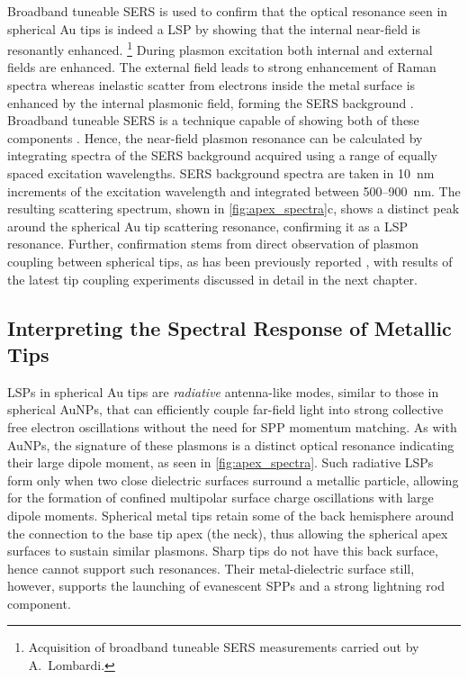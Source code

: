 \documentclass{article}
\begin{document}
Broadband tuneable SERS \cite{lombardi2015} is used to confirm that the optical resonance seen in spherical Au tips is indeed a LSP by showing that the internal near-field is resonantly enhanced.%
\footnote{Acquisition of broadband tuneable SERS measurements carried out by A.\ Lombardi.}
During plasmon excitation both internal and external fields are enhanced. The external field leads to strong enhancement of Raman spectra whereas inelastic scatter from electrons inside the metal surface is enhanced by the internal plasmonic field, forming the SERS background \cite{hugall2015}. Broadband tuneable SERS is a technique capable of showing both of these components \cite{lombardi2015}. Hence, the near-field plasmon resonance can be calculated by integrating spectra of the SERS background acquired using a range of equally spaced excitation wavelengths.
SERS background spectra are taken in \SI{10}{nm} increments of the excitation wavelength and integrated between 500--\SI{900}{nm}.
The resulting scattering spectrum, shown in \autoref{fig:apex_spectra}c, shows a distinct peak around the spherical Au tip scattering resonance, confirming it as a LSP resonance. Further, confirmation stems from direct observation of plasmon coupling between spherical tips, as has been previously reported \cite{savage2012}, with results of the latest tip coupling experiments discussed in detail in the next chapter.

\FloatBarrier
\subsection{Interpreting the Spectral Response of Metallic Tips}

LSPs in spherical Au tips are \emph{radiative} antenna-like modes, similar to those in spherical AuNPs, that can efficiently couple far-field light into strong collective free electron oscillations without the need for SPP momentum matching. As with AuNPs, the signature of these plasmons is a distinct optical resonance indicating their large dipole moment, as seen in \autoref{fig:apex_spectra}. Such radiative LSPs form only when two close dielectric surfaces surround a metallic particle, allowing for the formation of confined multipolar surface charge oscillations with large dipole moments. Spherical metal tips retain some of the back hemisphere around the connection to the base tip apex (the neck), thus allowing the spherical apex surfaces to sustain similar plasmons. Sharp tips do not have this back surface, hence cannot support such resonances.
Their metal-dielectric surface still, however, supports the launching of evanescent SPPs and a strong lightning rod component.
\end{document}
